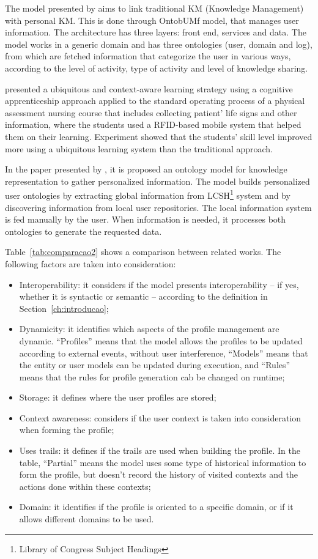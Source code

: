 \documentclass[preprint,authoryear,12pt,dvipdfm]{elsarticle}
\begin{document}
The model presented by \citet{razmerita11} aims to link traditional KM (Knowledge Management) with personal KM. This is done through OntobUMf model, that manages user information. The architecture has three layers: front end, services and data. The model works in a generic domain and has three ontologies (user, domain and log), from which are fetched information that categorize the user in various ways, according to the level of activity, type of activity and level of knowledge sharing.

\citet{wu12} presented a ubiquitous and context-aware learning strategy using a cognitive apprenticeship approach applied to the standard operating process of a physical assessment nursing course that includes collecting patient' life signs and other information, where the students used a RFID-based mobile system that helped them on their learning. Experiment showed that the students' skill level improved more using a ubiquitous learning system than the traditional approach.

In the paper presented by \citet{tao11}, it is proposed an ontology model for knowledge representation to gather personalized information. The model builds personalized user ontologies by extracting global information from LCSH\footnote{Library of Congress Subject Headings} system and by discovering information from local user repositories. The local information system is fed manually by the user. When information is needed, it processes both ontologies to generate the requested data.

Table~\ref{tab:comparacao2} shows a comparison between related works. The following factors are taken into consideration:

\begin{itemize}
  \item Interoperability: it considers if the model presents interoperability -- if yes, whether it is syntactic or semantic -- according to the definition in Section~\ref{ch:introducao};
  \item Dynamicity: it identifies which aspects of the profile management are dynamic. ``Profiles'' means that the model allows the profiles to be updated according to external events, without user interference, ``Models'' means that the entity or user models can be updated during execution, and ``Rules'' means that the rules for profile generation cab be changed on runtime;
  \item Storage: it defines where the user profiles are stored;
  \item Context awareness: considers if the user context is taken into consideration when forming the profile;
  \item Uses trails: it defines if the trails are used when building the profile. In the table, ``Partial'' means the model uses some type of historical information to form the profile, but doesn't record the history of visited contexts and the actions done within these contexts;
  \item Domain: it identifies if the profile is oriented to a specific domain, or if it allows different domains to be used.
\end{itemize}
\end{document}
